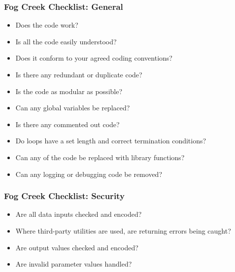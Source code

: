 \begin{frame}
\frametitle{Fog Creek Checklist: General}
\begin{changemargin}{1cm}

\begin{itemize}
\item Does the code work?
\item Is all the code easily understood?
\item Does it conform to your agreed coding conventions?
\item Is there any redundant or duplicate code?
\item Is the code as modular as possible?
\item Can any global variables be replaced?
\item Is there any commented out code?
\item Do loops have a set length and correct termination conditions?
\item Can any of the code be replaced with library functions?
\item Can any logging or debugging code be removed?
\end{itemize}


\end{changemargin}

\end{frame}

\begin{frame}
\frametitle{Fog Creek Checklist: Security}
\begin{changemargin}{1cm}

\begin{itemize}
\item Are all data inputs checked and encoded?
\item Where third-party utilities are used, are returning errors being caught?
\item Are output values checked and encoded?
\item Are invalid parameter values handled?
\end{itemize}


\end{changemargin}

\end{frame}

